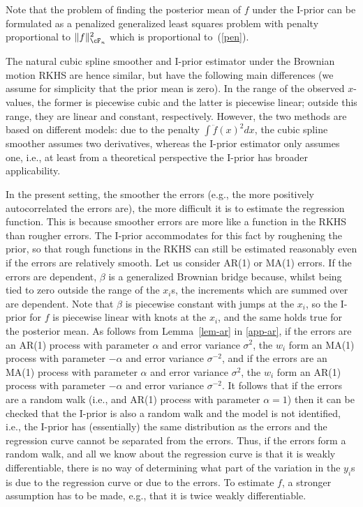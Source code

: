 \documentclass[preprint,12pt,authoryear]{elsarticle}
\DeclarePairedDelimiter{\norm}{\lVert}{\rVert}
\begin{document}
Note that the problem of finding the posterior mean of $f$ under the I-prior can be formulated as a penalized generalized least squares problem with penalty proportional to $\norm{f}_{\cF_n}^2$ which is proportional to~(\ref{pen}). 

The natural cubic spline smoother and I-prior estimator under the Brownian motion RKHS are hence similar, but have the following main differences (we assume for simplicity that the prior mean is zero). In the range of the observed $x$-values, the former is piecewise cubic and the latter is piecewise linear; outside this range, they are linear and constant, respectively.
However, the two methods are based on different models: due to the penalty $\int\ddot f(x)^2dx$, the cubic spline smoother assumes two derivatives, whereas the I-prior estimator only assumes one, i.e., at least from a theoretical perspective the I-prior has broader applicability. 


In the present setting, the smoother the errors (e.g., the more positively autocorrelated the errors are), the more difficult it is to estimate the regression function. This is because smoother errors are more like a function in the RKHS than rougher errors. The I-prior accommodates for this fact by roughening the prior, so that rough functions in the RKHS can still be estimated reasonably even if the errors are relatively smooth.
Let us consider AR(1) or MA(1) errors.
If the errors are dependent, $\beta$ is a generalized Brownian bridge because, whilst being tied to zero outside the range of the $x_i$s, the increments which are summed over are dependent.
Note that $\beta$ is piecewise constant with jumps at the $x_i$, so the I-prior for $f$ is piecewise linear with knots at the $x_i$, and the same holds true for the posterior mean.
As follows from Lemma~\ref{lem-ar} in \ref{app-ar}, if the errors are an AR(1) process with parameter $\alpha$ and error variance $\sigma^2$, the $w_i$ form an MA(1) process with parameter $-\alpha$ and error variance $\sigma^{-2}$, and if the errors are an MA(1) process with parameter $\alpha$ and error variance $\sigma^2$, the $w_i$ form an AR(1) process with parameter $-\alpha$ and error variance $\sigma^{-2}$.
It follows that if the errors are a random walk (i.e., and AR(1) process with parameter $\alpha=1$) then it can be checked that the I-prior is also a random walk and the model is not identified, i.e., the I-prior has (essentially) the same distribution as the errors and the regression curve cannot be separated from the errors. Thus, if the errors form a random walk, and all we know about the regression curve is that it is weakly differentiable, there is no way of determining what part of the variation in the $y_i$s is due to the regression curve or due to the errors. To estimate $f$, a stronger assumption has to be made, e.g., that it is twice weakly differentiable.
\end{document}
